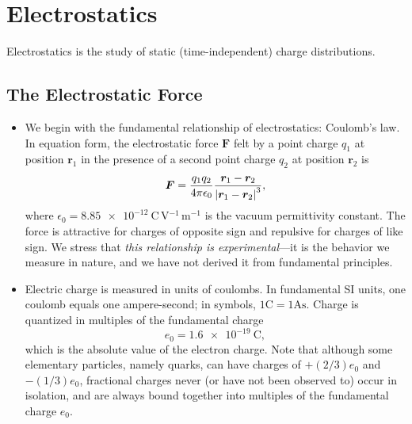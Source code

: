 \documentclass[11pt, a4paper]{article}
\renewcommand{\vec}[1]{\bm{#1}} %
\renewcommand{\r}{\vec{r}}
\newcommand{\ee}{\epsilon_{0}}  %
\begin{document}
\newpage

\pagestyle{empty}  %

\tableofcontents

\newpage

\pagestyle{fancy}  %

\section{Electrostatics}
Electrostatics is the study of static (time-independent) charge distributions.

\subsection{The Electrostatic Force}
\begin{itemize}
    \item We begin with the fundamental relationship of electrostatics: Coulomb's law. In equation form, the electrostatic force $ \vec{F} $ felt by a point charge $ q_{1} $ at position $ \r_{1} $ in the presence of a second point charge $ q_{2} $ at position $ \vec{r}_{2} $ is
    \begin{equation*}
        \vec{F} = \frac{q_{1}q_{2}}{4\pi \ee } \frac{\r_{1} - \r_{2}}{\abs{\r_{1} - \r_{2}}^{3}},
    \end{equation*}
    where $ \ee = \SI{8.85e-12}{\coulomb \, \volt^{-1}\, \meter^{-1}} $ is the vacuum permittivity constant. The force is attractive for charges of opposite sign and repulsive for charges of like sign. We stress that \textit{this relationship is experimental}---it is the behavior we measure in nature, and we have not derived it from fundamental principles. 

    \item Electric charge is measured in units of coulombs. In fundamental SI units, one coulomb equals one ampere-second; in symbols, $ 1\si{\coulomb} = 1\si{\ampere \second} $. Charge is quantized in multiples of the fundamental charge
    \begin{equation*}
        e_{0} = \SI{1.6e-19}{\coulomb},
    \end{equation*}
    which is the absolute value of the electron charge. Note that although some elementary particles, namely quarks, can have charges of $ +(2/3)e_{0} $ and $ -(1/3)e_{0} $, fractional charges never (or have not been observed to) occur in isolation, and are always bound together into multiples of the fundamental charge $ e_{0} $.


\end{itemize}
\end{document}
